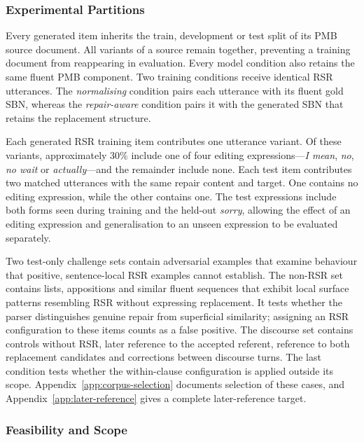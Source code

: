 \documentclass{article}
\begin{document}
\subsubsection{Experimental Partitions}

Every generated item inherits the train, development or test split of its PMB
source document. All variants of a source remain together, preventing a
training document from reappearing in evaluation. Every model condition also
retains the same fluent PMB component. Two training conditions receive
identical RSR utterances. The \emph{normalising} condition pairs each utterance
with its fluent gold SBN, whereas the \emph{repair-aware} condition pairs it
with the generated SBN that retains the replacement structure.

Each generated RSR training item contributes one utterance variant. Of these
variants, approximately 30\% include one of four editing
expressions---\textit{I mean}, \textit{no}, \textit{no wait} or
\textit{actually}---and the remainder include none. Each test item contributes
two matched utterances with the same repair content and target.
One contains no editing expression, while the other contains one. The test
expressions include both forms seen during training and the held-out
\textit{sorry}, allowing the effect of an editing expression and
generalisation to an unseen expression to be evaluated separately.

Two test-only challenge sets contain adversarial examples that examine
behaviour that positive, sentence-local RSR examples cannot establish. The
non-RSR set contains lists, appositions and similar fluent sequences that
exhibit local surface patterns resembling RSR without expressing replacement.
It tests whether the parser distinguishes genuine repair from superficial
similarity; assigning an RSR configuration to these items counts as a false
positive. The discourse set contains controls without RSR, later reference to
the accepted referent, reference to both replacement candidates and
corrections between discourse turns. The last condition tests whether the
within-clause configuration is applied outside its scope.
Appendix~\ref{app:corpus-selection} documents selection of these cases, and
Appendix~\ref{app:later-reference} gives a complete later-reference target.

\subsubsection{Feasibility and Scope}
\end{document}
